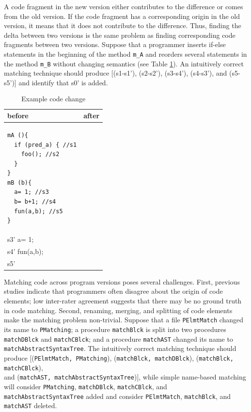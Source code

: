 \documentclass[runningheads,a4paper]{llncs}
\newcommand{\codefont}[1]{\footnotesize{\texttt{#1}}\normalsize}
\begin{document}
A code fragment in the new version either contributes to the difference or comes from the old version. If the code fragment has a corresponding origin in the old version, it means that it does not contribute to the difference. Thus, finding the delta between two versions is the same problem as finding corresponding code fragments between two versions. 
Suppose that a programmer inserts if-else statements in the beginning of the method \codefont{m\_A} and reorders several statements in the method \codefont{m\_B} without changing semantics (see Table \ref{code}). An intuitively correct matching technique should produce [(s1-s1'), (s2-s2'), (s3-s4'), (s4-s3'), and (s5-s5')] and identify that s0' is added.  
\begin{table} 
\footnotesize
\caption{Example code change}
\begin{tabular}{|p{}|p{}|} \hline
before & after \\ \hline
\begin{verbatim} 
mA (){
  if (pred_a) { //s1
    foo(); //s2
  } 
}
mB (b){ 
  a= 1; //s3
  b= b+1; //s4
  fun(a,b); //s5
} \end{verbatim} 
& 
\begin{verbatim} 
mA (){
  if (pred_a0) { //s0'
    if (pred_a) { //s1'
      foo(); //s2'
    } 
  }
}
mB (b){ 
  b= b+1; \\s3'
  a= 1; \\s4'
  fun(a,b); \\s5'
}\end{verbatim}
\\ 
\hline
\end{tabular} 
\label{code} 
\end{table}


Matching code across program versions poses several challenges. 
First, previous studies \cite{SKim2005} indicate that programmers often disagree about the origin of code elements; low inter-rater agreement suggests that there may be no ground truth in code matching.
Second, renaming, merging, and splitting of code elements make the matching problem non-trivial. Suppose that a file \codefont{PElmtMatch} changed its name to \codefont{PMatching}; a procedure \codefont{matchBlck} is split into two procedures \codefont{matchDBlck} and \codefont{matchCBlck}; and a procedure \codefont{matchAST} changed its name to \codefont{matchAbstractSyntaxTree}. 
The intuitively correct matching technique should produce [(\codefont{PElmtMatch, PMatching}), (\codefont{matchBlck, matchDBlck}), (\codefont{matchBlck, matchCBlck}), \\and (\codefont{matchAST, matchAbstractSyntaxTree})], 
while simple name-based matching will consider \codefont{PMatching}, \codefont{matchDBlck}, \codefont{matchCBlck}, and \codefont{matchAbstractSyntaxTree} added and consider \codefont{PElmtMatch}, \codefont{matchBlck}, and \codefont{matchAST} deleted.
\end{document}
